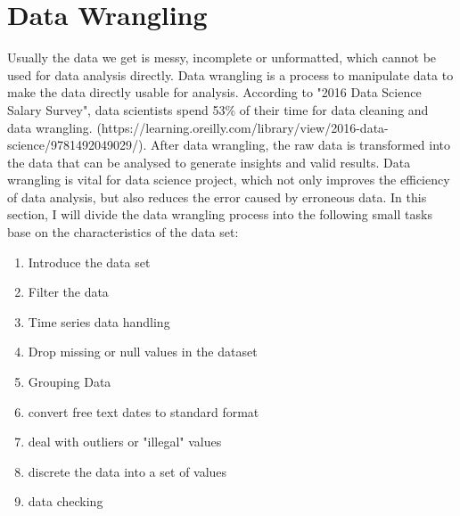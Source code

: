\documentclass[11pt]{article}
\theoremstyle{definition}
\begin{document}
\section{Data Wrangling} 
\label{dataWrangling}
Usually the data we get is messy, incomplete or unformatted, which cannot be used for data analysis directly. Data wrangling is a process to manipulate data to make the data directly usable for analysis. According to "2016 Data Science Salary Survey",  data scientists spend 53\% of their time for data cleaning and data wrangling. (https://learning.oreilly.com/library/view/2016-data-science/9781492049029/). After data wrangling, the raw data is transformed into the data that can be analysed to generate insights and valid results. Data wrangling is vital for data science project, which not only improves the efficiency of data analysis, but also reduces the error caused by erroneous data. In this section, I will divide the data wrangling process into the following small tasks base on the characteristics of the data set:
\begin{enumerate}
	\item Introduce the data set
	\item Filter the data
	\item Time series data handling	
	\item Drop missing or null values in the dataset
	\item Grouping Data
	\item convert free text dates to standard format
	\item deal with outliers or "illegal" values
	\item discrete the data into a set of values
	\item data checking
\end{enumerate}
\end{document}
